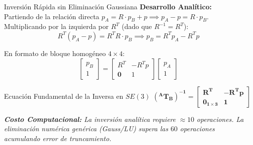 \documentclass[aspectratio=169]{beamer}
\begin{document}
\begin{frame}{Inversión Rápida sin Eliminación Gaussiana}
    \textbf{Desarrollo Analítico:}\\
    Partiendo de la relación directa $p_A = R \cdot p_B + p \implies p_A - p = R \cdot p_B$. \\
    Multiplicando por la izquierda por $R^T$ (dado que $R^{-1} = R^T$):
    \begin{equation*}
        R^T(p_A - p) = R^T R \cdot p_B \implies p_B = R^T p_A - R^T p
    \end{equation*}
    
    En formato de bloque homogéneo $4 \times 4$:
    \begin{equation*}
        \begin{bmatrix} p_B \\ 1 \end{bmatrix} = \begin{bmatrix} R^T & -R^T p \\ \mathbf{0} & 1 \end{bmatrix} \begin{bmatrix} p_A \\ 1 \end{bmatrix}
    \end{equation*}
    
    \vspace{0.2cm}
    \begin{exampleblock}{Ecuación Fundamental de la Inversa en $SE(3)$}
        \centering $\mathbf{(^{A}T_B)^{-1} = \begin{bmatrix} R^T & -R^T p \\ \mathbf{0}_{1\times3} & 1 \end{bmatrix}}$
    \end{exampleblock}
    
    \vspace{0.1cm}
    \small \textit{\textbf{Costo Computacional:} La inversión analítica requiere $\approx 10$ operaciones. La eliminación numérica genérica (Gauss/LU) supera las $60$ operaciones acumulando error de truncamiento.}
\end{frame}
\end{document}
